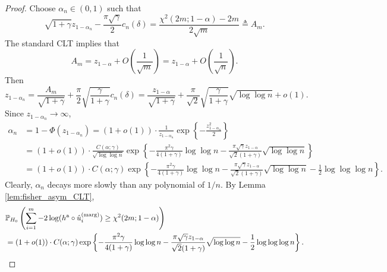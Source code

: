 \documentclass[11pt]{article}
\def\marg{\textnormal{(marg)}}
\def\asym{\textnormal{a}}
\renewcommand{\P}{\mathbb{P}}
\newcommand{\lb}{\left(}
\newcommand{\rb}{\right)}
\begin{document}
\begin{proof}
  Choose $\alpha_n\in (0, 1)$ such that
  \[\sqrt{1 + \gamma}z_{1 - \alpha_{n}} - \frac{\pi\sqrt{\gamma}}{2} c_{n}(\delta) = \frac{\chi^2(2m; 1 - \alpha) - 2m}{2\sqrt{m}} \triangleq A_m.\]
  The standard CLT implies that
  \begin{equation}
    \label{eq:chi_normal_approx}
    A_{m} = z_{1 - \alpha} + O\lb\frac{1}{\sqrt{m}}\rb = z_{1 - \alpha} + O\lb\frac{1}{\sqrt{n}}\rb.
  \end{equation}
  Then
  \begin{equation}
    \label{eq:alphan}
    z_{1 - \alpha_{n}} = \frac{A_{m}}{\sqrt{1 + \gamma}} + \frac{\pi}{2}\sqrt{\frac{\gamma}{1 + \gamma}}c_{n}(\delta) = \frac{z_{1-\alpha}}{\sqrt{1+\gamma}} + \frac{\pi}{\sqrt{2}}\sqrt{\frac{\gamma}{1 + \gamma}}\sqrt{\log\log n} + o(1).
  \end{equation}
  Since $z_{1 - \alpha_{n}}\rightarrow \infty$,
  \begin{align*}
    \alpha_{n}
    &= 1 - \Phi(z_{1 - \alpha_{n}}) = (1 + o(1))\cdot \frac{1}{z_{1 - \alpha_{n}}}\exp\left\{-\frac{z_{1 - \alpha_{n}}^2}{2}\right\}\\
    & = (1 + o(1))\cdot \frac{C(\alpha; \gamma)}{\sqrt{\log \log n}}\exp\left\{-\frac{\pi^2 \gamma}{4(1 + \gamma)}\log\log n - \frac{\pi\sqrt{\gamma}z_{1-\alpha}}{\sqrt{2}(1 + \gamma)}\sqrt{\log \log n}\right\}\\
    & = (1 + o(1))\cdot C(\alpha; \gamma)\exp\left\{-\frac{\pi^2 \gamma}{4(1 + \gamma)}\log\log n - \frac{\pi\sqrt{\gamma}z_{1-\alpha}}{\sqrt{2}(1 + \gamma)}\sqrt{\log \log n} - \frac{1}{2}\log\log\log n\right\}.
  \end{align*}
  Clearly, $\alpha_{n}$ decays more slowly than any polynomial of $1/n$. By Lemma \ref{lem:fisher_asym_CLT},
  \begin{align*}
    &\P_{H_0}\lb\sum_{i=1}^{m} -2\log(h^\asym \circ \hat{u}_i^\marg)\ge \chi^2(2m; 1 - \alpha)\rb\\
    & = (1 + o(1))\cdot C(\alpha; \gamma)\exp\left\{-\frac{\pi^2 \gamma}{4(1 + \gamma)}\log\log n - \frac{\pi\sqrt{\gamma}z_{1-\alpha}}{\sqrt{2}(1 + \gamma)}\sqrt{\log \log n} - \frac{1}{2}\log\log\log n\right\}.
  \end{align*}
\end{proof}
\end{document}
